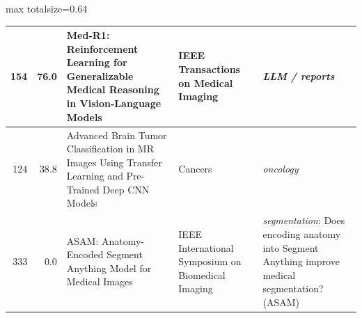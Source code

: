 \documentclass[aspectratio=169]{beamer}
\begin{document}
\begin{frame}
\begin{adjustbox}{max totalsize={\textwidth}{0.64\textheight}}
\begin{tabular}{|r|r|>{\raggedright\arraybackslash}p{}|>{\raggedright\arraybackslash}p{}|>{\raggedright\arraybackslash}p{}|}
154 & 76.0 & Med-R1: Reinforcement Learning for Generalizable Medical Reasoning in Vision-Language Models & IEEE Transactions on Medical Imaging & \textit{LLM / reports} \\ \hline
124 & 38.8 & Advanced Brain Tumor Classification in MR Images Using Transfer Learning and Pre-Trained Deep CNN Models & Cancers & \textit{oncology} \\ \hline
333 & 0.0 & ASAM: Anatomy-Encoded Segment Anything Model for Medical Images & IEEE International Symposium on Biomedical Imaging & \textit{segmentation}: Does encoding anatomy into Segment Anything improve medical segmentation? (ASAM) \\ \hline
\end{tabular}
\end{adjustbox}
\\[1pt]
\end{frame}
\end{document}
